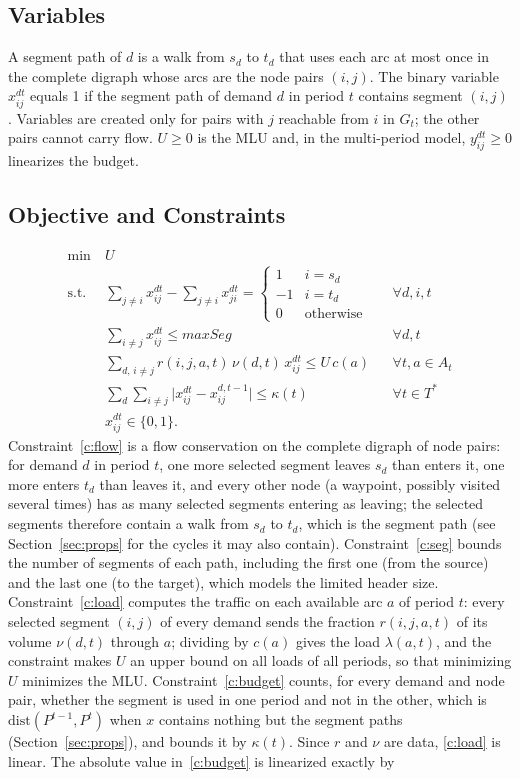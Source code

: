 \documentclass[conference]{IEEEtran}
\begin{document}
\subsection{Variables}
A segment path of $d$ is a walk from $s_d$ to $t_d$ that uses each arc at most once in the complete digraph whose arcs are the node pairs $(i,j)$. The binary variable $x^{dt}_{ij}$ equals 1 if the segment path of demand $d$ in period $t$ contains segment $(i,j)$. Variables are created only for pairs with $j$ reachable from $i$ in $G_t$; the other pairs cannot carry flow. $U\ge0$ is the MLU and, in the multi-period model, $y^{dt}_{ij}\ge0$ linearizes the budget.

\subsection{Objective and Constraints}
\begin{align}
\min\ & U\nonumber\\
\text{s.t. } & \sum_{j\neq i}x^{dt}_{ij}-\sum_{j\neq i}x^{dt}_{ji}=
\begin{cases}1& i=s_d\\-1& i=t_d\\0&\text{otherwise}\end{cases} && \forall d,i,t \label{c:flow}\\
& \sum_{i\neq j}x^{dt}_{ij}\le maxSeg && \forall d,t \label{c:seg}\\
& \sum_{d,\,i\neq j} r(i,j,a,t)\,\nu(d,t)\,x^{dt}_{ij}\le U\,c(a) && \forall t,a\in A_t \label{c:load}\\
& \sum_d\sum_{i\neq j}\bigl|x^{dt}_{ij}-x^{d,t-1}_{ij}\bigr|\le\kappa(t) && \forall t\in T^* \label{c:budget}\\
& x^{dt}_{ij}\in\{0,1\}.\nonumber
\end{align}
Constraint~\eqref{c:flow} is a flow conservation on the complete digraph of node pairs: for demand $d$ in period $t$, one more selected segment leaves $s_d$ than enters it, one more enters $t_d$ than leaves it, and every other node (a waypoint, possibly visited several times) has as many selected segments entering as leaving; the selected segments therefore contain a walk from $s_d$ to $t_d$, which is the segment path (see Section~\ref{sec:props} for the cycles it may also contain). Constraint~\eqref{c:seg} bounds the number of segments of each path, including the first one (from the source) and the last one (to the target), which models the limited header size. Constraint~\eqref{c:load} computes the traffic on each available arc $a$ of period $t$: every selected segment $(i,j)$ of every demand sends the fraction $r(i,j,a,t)$ of its volume $\nu(d,t)$ through $a$; dividing by $c(a)$ gives the load $\lambda(a,t)$, and the constraint makes $U$ an upper bound on all loads of all periods, so that minimizing $U$ minimizes the MLU. Constraint~\eqref{c:budget} counts, for every demand and node pair, whether the segment is used in one period and not in the other, which is $\mathrm{dist}(P^{t-1},P^t)$ when $x$ contains nothing but the segment paths (Section~\ref{sec:props}), and bounds it by $\kappa(t)$. Since $r$ and $\nu$ are data, \eqref{c:load} is linear. The absolute value in~\eqref{c:budget} is linearized exactly by
\end{document}
